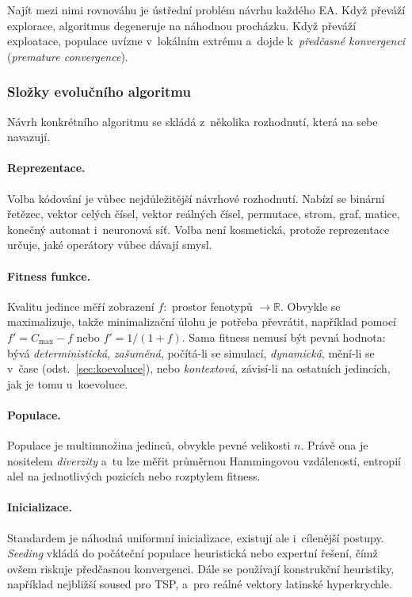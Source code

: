 \documentclass[11pt,a4paper]{article}
\theoremstyle{definition}
\begin{document}
Najít mezi nimi rovnováhu je ústřední problém návrhu každého EA. Když převáží explorace,
algoritmus degeneruje na náhodnou procházku. Když převáží exploatace, populace uvízne
v~lokálním extrému a~dojde k~\emph{předčasné konvergenci} (\emph{premature convergence}).

\subsubsection{Složky evolučního algoritmu}

Návrh konkrétního algoritmu se skládá z~několika rozhodnutí, která na sebe navazují.

\paragraph{Reprezentace.} Volba kódování je vůbec nejdůležitější návrhové rozhodnutí.
Nabízí se binární řetězec, vektor celých čísel, vektor reálných čísel, permutace,
strom, graf, matice, konečný automat i~neuronová síť. Volba není kosmetická, protože
reprezentace určuje, jaké operátory vůbec dávají smysl.

\paragraph{Fitness funkce.} Kvalitu jedince měří zobrazení $f:$ prostor fenotypů
$\to \mathbb{R}$. Obvykle se maximalizuje, takže minimalizační úlohu je potřeba převrátit,
například pomocí $f' = C_{\max} - f$ nebo $f' = 1/(1+f)$. Sama fitness nemusí být pevná
hodnota: bývá \emph{deterministická}, \emph{zašuměná}, počítá-li se simulací,
\emph{dynamická}, mění-li se v~čase (odst.~\ref{sec:koevoluce}), nebo \emph{kontextová},
závisí-li na ostatních jedincích, jak je tomu u~koevoluce.

\paragraph{Populace.} Populace je multimnožina jedinců, obvykle pevné velikosti $n$.
Právě ona je nositelem \emph{diverzity} a~tu lze měřit průměrnou Hammingovou vzdáleností,
entropií alel na jednotlivých pozicích nebo rozptylem fitness.

\paragraph{Inicializace.} Standardem je náhodná uniformní inicializace, existují ale
i~cílenější postupy. \emph{Seeding} vkládá do počáteční populace heuristická nebo
expertní řešení, čímž ovšem riskuje předčasnou konvergenci. Dále se používají konstrukční
heuristiky, například nejbližší soused pro TSP, a~pro reálné vektory latinské hyperkrychle.
\end{document}
